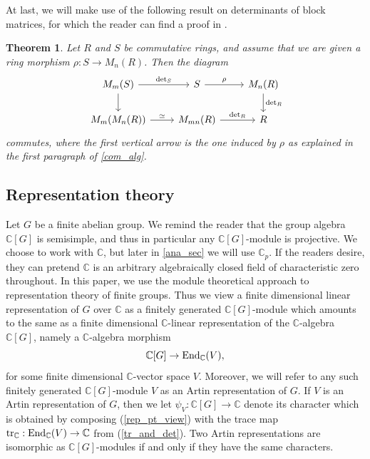 \documentclass[11pt]{amsart}
\newtheorem{theorem}{Theorem}[section]
\numberwithin{equation}{section}
\theoremstyle{remark}
\theoremstyle{definition}
\begin{document}
At last, we will make use of the following result on determinants of block matrices, for which the reader can find a proof in \cite{Silvester:2000}.
\begin{theorem} \label{silvester}
Let $R$ and $S$ be commutative rings, and assume that we are given a ring morphism $\rho: S \rightarrow M_{n}(R)$.  Then the diagram
\begin{equation*}
\begin{tikzcd}
M_{m}(S) \arrow[,d] \arrow["{\rm det}_{S}",r] & S  \arrow["\rho",r] & M_{n}(R) \arrow["{\rm det}_{R}",d]\\
M_{m}(M_{n}(R))  \arrow["\simeq",r] & M_{mn}(R) \arrow["{\rm det}_{R}",r] & R
\end{tikzcd}
\end{equation*}
commutes, where the first vertical arrow is the one induced by $\rho$ as explained in the first paragraph of \cref{com_alg}.
\end{theorem}


\subsection{Representation theory} \label{section:rep}
Let $G$ be a finite abelian group.  We remind the reader that the group algebra $\mathbb{C}[G]$ is semisimple, and thus in particular any $\mathbb{C}[G]$-module is projective.  We choose to work with $\mathbb{C}$, but later in \cref{ana_sec} we will use $\mathbb{C}_{p}$.  If the readers desire, they can pretend $\mathbb{C}$ is an arbitrary algebraically closed field of characteristic zero throughout.  In this paper, we use the module theoretical approach to representation theory of finite groups.  Thus we view a finite dimensional linear representation of $G$ over $\mathbb{C}$ as a finitely generated $\mathbb{C}[G]$-module which amounts to the same as a finite dimensional $\mathbb{C}$-linear representation of the $\mathbb{C}$-algebra $\mathbb{C}[G]$, namely a $\mathbb{C}$-algebra morphism
\begin{equation} \label{rep_pt_view}
\mathbb{C}[G] \rightarrow {\rm End}_{\mathbb{C}}(V), 
\end{equation}
for some finite dimensional $\mathbb{C}$-vector space $V$.  Moreover, we will refer to any such finitely generated $\mathbb{C}[G]$-module $V$ as an Artin representation of $G$.  If $V$ is an Artin representation of $G$, then we let $\psi_{V}:\mathbb{C}[G] \rightarrow \mathbb{C}$ denote its character which is obtained by composing (\ref{rep_pt_view}) with the trace map ${\rm tr}_{\mathbb{C}}: {\rm End}_{\mathbb{C}}(V) \rightarrow \mathbb{C}$ from (\ref{tr_and_det}).  Two Artin representations are isomorphic as $\mathbb{C}[G]$-modules if and only if they have the same characters.  
\end{document}
